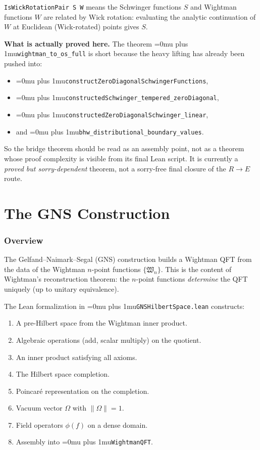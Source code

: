 \documentclass[11pt,a4paper]{article}
\newcommand{\leanname}[1]{\begingroup\Urlmuskip=0mu plus 1mu\relax\nolinkurl{#1}\endgroup}
\begin{document}
\noindent \texttt{IsWickRotationPair S W} means the Schwinger functions $S$
and Wightman functions $W$ are related by Wick rotation: evaluating the
analytic continuation of $W$ at Euclidean (Wick-rotated) points gives $S$.

\medskip\noindent
\textbf{What is actually proved here.}
The theorem \leanname{wightman\_to\_os\_full} is short because the heavy lifting
has already been pushed into:
\begin{itemize}
\item \leanname{constructZeroDiagonalSchwingerFunctions},
\item \leanname{constructedSchwinger\_tempered\_zeroDiagonal},
\item \leanname{constructedZeroDiagonalSchwinger\_linear},
\item and \leanname{bhw\_distributional\_boundary\_values}.
\end{itemize}

\noindent
So the bridge theorem should be read as an assembly point, not as a theorem
whose proof complexity is visible from its final Lean script. It is currently a
\emph{proved but sorry-dependent} theorem, not a sorry-free final closure of the
$R \to E$ route.


\part{The GNS Construction}

\section{Overview}

The Gelfand--Naimark--Segal (GNS) construction builds a Wightman QFT
from the data of the Wightman $n$-point functions $\{\mathfrak{W}_n\}$.
This is the content of Wightman's reconstruction theorem: the $n$-point
functions \emph{determine} the QFT uniquely (up to unitary equivalence).

The Lean formalization in \leanname{GNSHilbertSpace.lean} constructs:
\begin{enumerate}
\item A pre-Hilbert space from the Wightman inner product.
\item Algebraic operations (add, scalar multiply) on the quotient.
\item An inner product satisfying all axioms.
\item The Hilbert space completion.
\item Poincar\'e representation on the completion.
\item Vacuum vector $\Omega$ with $\|\Omega\| = 1$.
\item Field operators $\phi(f)$ on a dense domain.
\item Assembly into \leanname{WightmanQFT}.
\end{enumerate}
\end{document}
